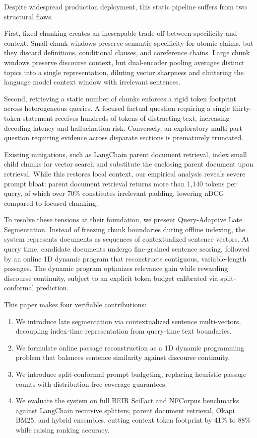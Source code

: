 \documentclass[preprint,12pt]{article}
\begin{document}
Despite widespread production deployment, this static pipeline suffers from two structural flaws.

First, fixed chunking creates an inescapable trade-off between specificity and context. Small chunk windows preserve semantic specificity for atomic claims, but they discard definitions, conditional clauses, and coreference chains. Large chunk windows preserve discourse context, but dual-encoder pooling averages distinct topics into a single representation, diluting vector sharpness and cluttering the language model context window with irrelevant sentences.

Second, retrieving a static number of chunks enforces a rigid token footprint across heterogeneous queries. A focused factual question requiring a single thirty-token statement receives hundreds of tokens of distracting text, increasing decoding latency and hallucination risk. Conversely, an exploratory multi-part question requiring evidence across disparate sections is prematurely truncated.

Existing mitigations, such as LangChain parent document retrieval, index small child chunks for vector search and substitute the enclosing parent document upon retrieval. While this restores local context, our empirical analysis reveals severe prompt bloat: parent document retrieval returns more than 1,140 tokens per query, of which over 70\% constitutes irrelevant padding, lowering nDCG compared to focused chunking.

To resolve these tensions at their foundation, we present Query-Adaptive Late Segmentation. Instead of freezing chunk boundaries during offline indexing, the system represents documents as sequences of contextualized sentence vectors. At query time, candidate documents undergo fine-grained sentence scoring, followed by an online 1D dynamic program that reconstructs contiguous, variable-length passages. The dynamic program optimizes relevance gain while rewarding discourse continuity, subject to an explicit token budget calibrated via split-conformal prediction.

This paper makes four verifiable contributions:
\begin{enumerate}
    \item We introduce late segmentation via contextualized sentence multi-vectors, decoupling index-time representation from query-time text boundaries.
    \item We formulate online passage reconstruction as a 1D dynamic programming problem that balances sentence similarity against discourse continuity.
    \item We introduce split-conformal prompt budgeting, replacing heuristic passage counts with distribution-free coverage guarantees.
    \item We evaluate the system on full BEIR SciFact and NFCorpus benchmarks against LangChain recursive splitters, parent document retrieval, Okapi BM25, and hybrid ensembles, cutting context token footprint by 41\% to 88\% while raising ranking accuracy.
\end{enumerate}
\end{document}
